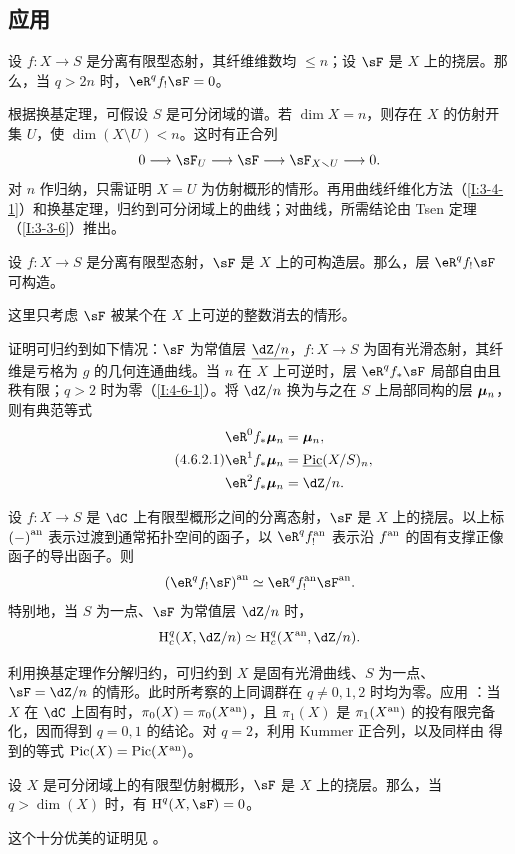 \subsection{应用}\label{I:4-6}
\begin{theorem}[消失定理]\label{I:4-6-1}
设 $f:X\to S$ 是分离有限型态射，其纤维维数均 $\leqslant n$；设 $\sF$ 是 $X$ 上的挠层。那么，当 $q>2n$ 时，$\eR^qf_!\sF=0$。
\end{theorem}
根据换基定理，可假设 $S$ 是可分闭域的谱。若 $\dim X=n$，则存在 $X$ 的仿射开集 $U$，使 $\dim(X\setminus U)<n$。这时有正合列
\[
0\longrightarrow\sF_U\longrightarrow\sF\longrightarrow\sF_{X\setminus U}\longrightarrow0.
\]
对 $n$ 作归纳，只需证明 $X=U$ 为仿射概形的情形。再用曲线纤维化方法（\ref{I:3-4-1}）和换基定理，归约到可分闭域上的曲线；对曲线，所需结论由 Tsen 定理（\ref{I:3-3-6}）推出。
\begin{theorem}[有限性定理]\label{I:4-6-2}
设 $f:X\to S$ 是分离有限型态射，$\sF$ 是 $X$ 上的可构造层。那么，层 $\eR^qf_!\sF$ 可构造。
\end{theorem}
这里只考虑 $\sF$ 被某个在 $X$ 上可逆的整数消去的情形。

证明可归约到如下情况：$\sF$ 为常值层 $\const{\dZ/n}$，$f:X\to S$ 为固有光滑态射，其纤维是亏格为 $g$ 的几何连通曲线。当 $n$ 在 $X$ 上可逆时，层 $\eR^qf_*\sF$ 局部自由且秩有限；$q>2$ 时为零（\ref{I:4-6-1}）。将 $\dZ/n$ 换为与之在 $S$ 上局部同构的层 ${\bm\mu}_n$，则有典范等式
\begin{equation*}\tag{4.6.2.1}\label{I:eq:4-6-2-1}
\begin{aligned}
\eR^0f_*\dmu_n&=\dmu_n,\\
\eR^1f_*\dmu_n&=\const\pic(X/S)_n,\\
\eR^2f_*\dmu_n&=\dZ/n.
\end{aligned}
\end{equation*}
\begin{theorem}[与经典上同调的比较]\label{I:4-6-3}
设 $f:X\to S$ 是 $\dC$ 上有限型概形之间的分离态射，$\sF$ 是 $X$ 上的挠层。以上标 ${(-)}^{\textnormal{an}}$ 表示过渡到通常拓扑空间的函子，以 $\eR^q\an f_!$ 表示沿 ${f}^{\textnormal{an}}$ 的固有支撑正像函子的导出函子。则
\[
\an{(\eR^qf_!\sF)}\simeq\eR^q\an f_!\an\sF.
\]
特别地，当 $S$ 为一点、$\sF$ 为常值层 $\dZ/n$ 时，
\[
\h_c^q(X,\dZ/n)\simeq\h_c^q(\an X,\dZ/n).
\]
\end{theorem}
利用换基定理作分解归约，可归约到 $X$ 是固有光滑曲线、$S$ 为一点、$\sF=\dZ/n$ 的情形。此时所考察的上同调群在 $q\ne0,1,2$ 时均为零。应用 \cite{se55}：当 $X$ 在 $\dC$ 上固有时，$\pi_0(X)=\pi_0({X}^{\textnormal{an}})$，且 $\pi_1(X)$ 是 $\pi_1({X}^{\textnormal{an}})$ 的投有限完备化，因而得到 $q=0,1$ 的结论。对 $q=2$，利用 Kummer 正合列，以及同样由 \cite{se55} 得到的等式 $\operatorname{Pic}(X)=\operatorname{Pic}({X}^{\textnormal{an}})$。
\begin{theorem}[仿射概形的上同调维数]\label{I:4-6-4}
设 $X$ 是可分闭域上的有限型仿射概形，$\sF$ 是 $X$ 上的挠层。那么，当 $q>\dim(X)$ 时，有 $\h^q(X,\sF)=0$。
\end{theorem}
这个十分优美的证明见 \cite[XIV \S2,3]{sga4}。

